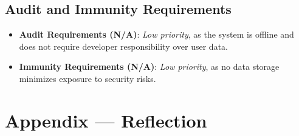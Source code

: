 \documentclass{article}
\begin{document}
\subsection{Audit and Immunity Requirements}
\begin{itemize}
    \item \textbf{Audit Requirements (N/A)}: \textit{Low priority}, as the system is offline and does not require developer responsibility over user data.
    \item \textbf{Immunity Requirements (N/A)}: \textit{Low priority}, as no data storage minimizes exposure to security risks.
\end{itemize}


\newpage{}

\section*{Appendix --- Reflection}


\end{document}
